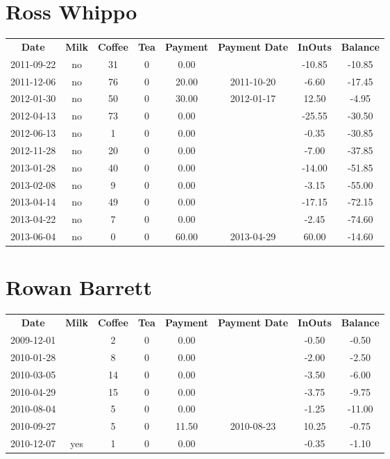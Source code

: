 \section{Ross Whippo}

\begin{center}
\begin{tabular}{cccccccc}
\textbf{Date} & \textbf{Milk} & \textbf{Coffee} & \textbf{Tea} & \textbf{Payment} & \textbf{Payment Date} & \textbf{InOuts} & \textbf{Balance} \\
2011-09-22 & no & 31 & 0 &  0.00 &  & -10.85 & -10.85\\ 
2011-12-06 & no & 76 & 0 & 20.00 & 2011-10-20 &  -6.60 & -17.45\\ 
2012-01-30 & no & 50 & 0 & 30.00 & 2012-01-17 &  12.50 &  -4.95\\ 
2012-04-13 & no & 73 & 0 &  0.00 &  & -25.55 & -30.50\\ 
2012-06-13 & no &  1 & 0 &  0.00 &  &  -0.35 & -30.85\\ 
2012-11-28 & no & 20 & 0 &  0.00 &  &  -7.00 & -37.85\\ 
2013-01-28 & no & 40 & 0 &  0.00 &  & -14.00 & -51.85\\ 
2013-02-08 & no &  9 & 0 &  0.00 &  &  -3.15 & -55.00\\ 
2013-04-14 & no & 49 & 0 &  0.00 &  & -17.15 & -72.15\\ 
2013-04-22 & no &  7 & 0 &  0.00 &  &  -2.45 & -74.60\\ 
2013-06-04 & no &  0 & 0 & 60.00 & 2013-04-29 &  60.00 & -14.60
\end{tabular}
\end{center}

\section{Rowan Barrett}

\begin{center}
\begin{tabular}{cccccccc}
\textbf{Date} & \textbf{Milk} & \textbf{Coffee} & \textbf{Tea} & \textbf{Payment} & \textbf{Payment Date} & \textbf{InOuts} & \textbf{Balance} \\
2009-12-01 &  &  2 & 0 &  0.00 &  & -0.50 &  -0.50\\ 
2010-01-28 &  &  8 & 0 &  0.00 &  & -2.00 &  -2.50\\ 
2010-03-05 &  & 14 & 0 &  0.00 &  & -3.50 &  -6.00\\ 
2010-04-29 &  & 15 & 0 &  0.00 &  & -3.75 &  -9.75\\ 
2010-08-04 &  &  5 & 0 &  0.00 &  & -1.25 & -11.00\\ 
2010-09-27 &  &  5 & 0 & 11.50 & 2010-08-23 & 10.25 &  -0.75\\ 
2010-12-07 & yes &  1 & 0 &  0.00 &  & -0.35 &  -1.10
\end{tabular}
\end{center}

